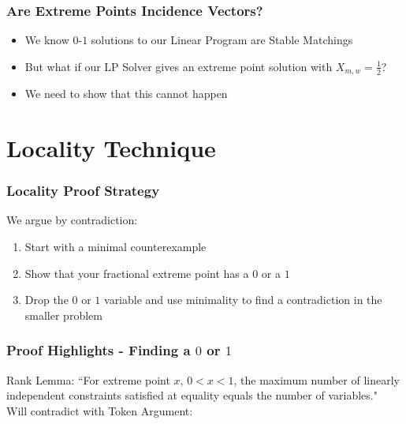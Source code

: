 \documentclass[10pt]{beamer}
\begin{document}
\begin{frame}
\frametitle{Are Extreme Points Incidence Vectors?}
\begin{itemize}
\item We know $0$-$1$ solutions to our Linear Program are Stable Matchings
\item But what if our LP Solver gives an extreme point solution with \alert{$X_{m,w} = \frac{1}{2}$}?
\item We need to show that this cannot happen
\end{itemize}
\end{frame}

\section{Locality Technique}
\begin{frame}
\frametitle{Locality Proof Strategy}
We argue by contradiction:
\begin{enumerate}
\item Start with a minimal counterexample
\item \alert<2>{Show that your fractional extreme point has a $0$ or a $1$}
\item Drop the $0$ or $1$ variable and use minimality to find a contradiction in the smaller problem
\end{enumerate}
\end{frame}

\begin{frame}
\frametitle{Proof Highlights - Finding a $0$ or $1$}
\alert{Rank Lemma:} ``For extreme point $x$, $0 < x < 1$, the maximum number of linearly independent constraints satisfied at equality equals the number of variables."\\
Will contradict with \alert{Token Argument:}
\begin{figure}
\centering
{}
\end{figure}
\end{frame}
\end{document}
